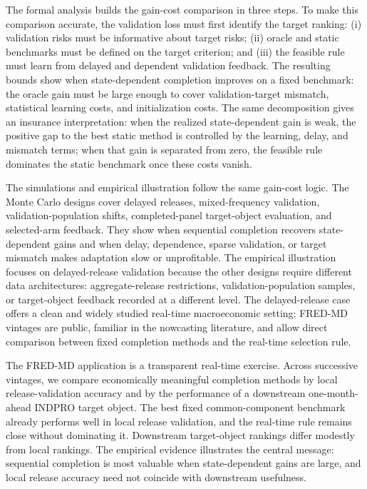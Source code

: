 \documentclass[a4paper, 12pt]{article}
\theoremstyle{plain}
\theoremstyle{remark}
\newcommand{\1}{\mathbf{1}}
\begin{document}
The formal analysis builds the gain-cost comparison in three steps. To make this comparison accurate, the validation loss must first identify the target ranking: (i) validation risks must be informative about target risks; (ii) oracle and static benchmarks must be defined on the target criterion; and (iii) the feasible rule must learn from delayed and dependent validation feedback. The resulting bounds show when state-dependent completion improves on a fixed benchmark: the oracle gain must be large enough to cover validation-target mismatch, statistical learning costs, and initialization costs. The same decomposition gives an insurance interpretation: when the realized state-dependent gain is weak, the positive gap to the best static method is controlled by the learning, delay, and mismatch terms; when that gain is separated from zero, the feasible rule dominates the static benchmark once these costs vanish.

The simulations and empirical illustration follow the same gain-cost logic. The Monte Carlo designs cover delayed releases, mixed-frequency validation, validation-population shifts, completed-panel target-object evaluation, and selected-arm feedback. They show when sequential completion recovers state-dependent gains and when delay, dependence, sparse validation, or target mismatch makes adaptation slow or unprofitable. The empirical illustration focuses on delayed-release validation because the other designs require different data architectures: aggregate-release restrictions, validation-population samples, or target-object feedback recorded at a different level. The delayed-release case offers a clean and widely studied real-time macroeconomic setting: FRED-MD vintages are public, familiar in the nowcasting literature, and allow direct comparison between fixed completion methods and the real-time selection rule.

The FRED-MD application is a transparent real-time exercise. Across successive vintages, we compare economically meaningful completion methods by local release-validation accuracy and by the performance of a downstream one-month-ahead INDPRO target object. The best fixed common-component benchmark already performs well in local release validation, and the real-time rule remains close without dominating it. Downstream target-object rankings differ modestly from local rankings. The empirical evidence illustrates the central message: sequential completion is most valuable when state-dependent gains are large, and local release accuracy need not coincide with downstream usefulness.
\end{document}
